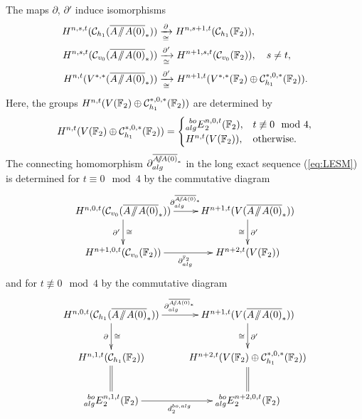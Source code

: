\begin{prop}\label{prop:E2boMSSAA0}
The maps $\partial$, $\partial'$ induce isomorphisms
\begin{align*}
H^{n,s,t}(\mc{C}_{h_1}(\AA0)) &  \xrightarrow[\cong]{\partial} H^{n, s+1, t}(\mc{C}_{h_1}(\FF_2)), 
\\
H^{n,s,t}(\mc{C}_{v_0}(\AA0)) & \xrightarrow[\cong]{\partial'} H^{n+1,s, t}(\mc{C}_{v_0}(\FF_2)),
\quad s \ne t,
\\
H^{n,t}(V^{*,*}(\AA0)) & \xrightarrow[\cong]{\partial'} H^{n+1, t}(V^{*,*}(\FF_2)\oplus \mc{C}^{*,0,*}_{h_1}(\FF_2)).
\end{align*}
Here, the groups $H^{n, t}(V(\mathbb{F}_2)\oplus \mathcal{C}^{*,0,*}_{h_1}(\mathbb{F}_2))$ are determined by
$$
H^{n, t}(V(\mathbb{F}_2)\oplus \mathcal{C}^{*,0,*}_{h_1}(\mathbb{F}_2)) =
\begin{cases}
\prescript{bo}{alg}{E}^{n,0,t}_2(\mathbb{F}_2), & t \not\equiv 0 \mod 4, \\
H^{n,t}(V(\mathbb{F}_2)), & \mathrm{otherwise}.
\end{cases}
$$
The connecting homomorphism $\partial_{alg}^{\AA0}$
in the long exact sequence (\ref{eq:LESM}) is determined for $t \equiv 0 \mod 4$ by the commutative diagram
$$
\xymatrix{
H^{n,0,t}(\mc{C}_{v_0}(\AA0)) \ar[r]^{\partial_{alg}^{\AA0}} \ar[d]_{\partial'}^{\cong} &
H^{n+1,t}(V(\AA0)) \ar[d]^{\partial'}_{\cong}
\\
H^{n+1,0,t}(\mc{C}_{{v_0}}(\FF_2)) \ar[r]_{\partial_{alg}^{\FF_2}} &
H^{n+2,t}(V(\FF_2))
}
$$
and for $t \not\equiv 0 \mod 4$ by the commutative diagram
$$
\xymatrix{
H^{n,0,t}(\mc{C}_{h_1}(\AA0)) \ar[r]^{\partial_{alg}^{\AA0}} \ar[d]_{\partial}^{\cong} &
H^{n+1,t}(V(\AA0)) \ar[d]^{\partial'}_{\cong}
\\
H^{n,1,t}(\mc{C}_{h_1}(\FF_2)) \ar@{=}[d] &
H^{n+2,t}(V(\FF_2) \oplus \mc{C}^{*,0,*}_{h_1}(\FF_2)) \ar@{=}[d]
\\
\E{bo}{alg}_2^{n,1,t}(\FF_2) \ar[r]_{d_2^{bo,alg}} &
\E{bo}{alg}_2^{n+2,0,t}(\FF_2)
}
$$
\end{prop}

